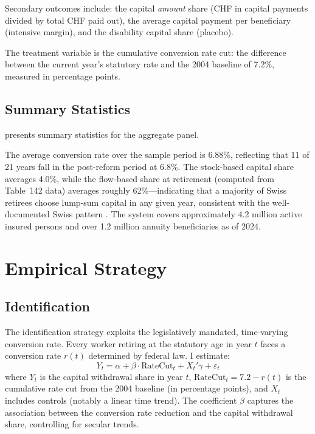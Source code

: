 \documentclass[12pt]{article}
\begin{document}
Secondary outcomes include: the capital \textit{amount} share (CHF in capital payments divided by total CHF paid out), the average capital payment per beneficiary (intensive margin), and the disability capital share (placebo).

The treatment variable is the cumulative conversion rate cut: the difference between the current year's statutory rate and the 2004 baseline of 7.2\%, measured in percentage points.

\subsection{Summary Statistics}

 presents summary statistics for the aggregate panel.



The average conversion rate over the sample period is 6.88\%, reflecting that 11 of 21 years fall in the post-reform period at 6.8\%. The stock-based capital share averages 4.0\%, while the flow-based share at retirement (computed from Table~142 data) averages roughly 62\%---indicating that a majority of Swiss retirees choose lump-sum capital in any given year, consistent with the well-documented Swiss pattern \citep{butlerteppa2007}. The system covers approximately 4.2 million active insured persons and over 1.2 million annuity beneficiaries as of 2024.


\section{Empirical Strategy}
\label{sec:strategy}

\subsection{Identification}

The identification strategy exploits the legislatively mandated, time-varying conversion rate. Every worker retiring at the statutory age in year $t$ faces a conversion rate $r(t)$ determined by federal law. I estimate:
\begin{equation}
Y_t = \alpha + \beta \cdot \text{RateCut}_t + X_t'\gamma + \varepsilon_t
\label{eq:main}
\end{equation}
where $Y_t$ is the capital withdrawal share in year $t$, $\text{RateCut}_t = 7.2 - r(t)$ is the cumulative rate cut from the 2004 baseline (in percentage points), and $X_t$ includes controls (notably a linear time trend). The coefficient $\beta$ captures the association between the conversion rate reduction and the capital withdrawal share, controlling for secular trends.
\end{document}
